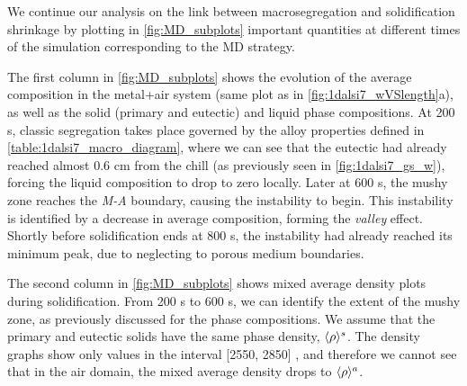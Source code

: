 

We continue our analysis on the link between macrosegregation and solidification shrinkage by plotting in \cref{fig:MD_subplots} important 
quantities at different times of the simulation corresponding to the MD strategy.

The first column in \cref{fig:MD_subplots} shows the evolution of the average composition in the metal+air system 
(same plot as in \cref{fig:1dalsi7_wVSlength}a), as well as the solid (primary and eutectic) and liquid phase compositions. 
At 200 s, classic segregation takes place governed by the alloy properties defined in \cref{table:1dalsi7_macro_diagram},
where we can see that the eutectic had already reached almost 0.6 cm from the chill (as previously seen in \cref{fig:1dalsi7_gs_w}), 
forcing the liquid composition to drop to zero locally.
Later at 600 s, the mushy zone reaches the \emph{M-A} boundary, causing the instability to begin. This instability is identified by
a decrease in average composition, forming the \emph{valley} effect. Shortly before solidification ends at 800 s, the instability had
already reached its minimum peak, due to neglecting to porous medium boundaries. 

The second column in \cref{fig:MD_subplots} shows mixed average density plots during solidification. From 200 s to 600 s, we can identify
the extent of the mushy zone, as previously discussed for the phase compositions. We assume that the primary and eutectic solids have the same phase density, $\langle \rho \rangle^s$.
The density graphs show only values in the interval [2550, 2850] \si{\udensity}, and therefore we cannot see that in the air domain, the mixed average density
drops to $\langle \rho \rangle^a$. 

